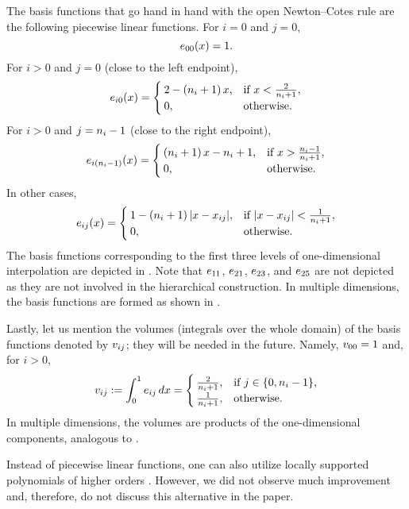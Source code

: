 
The basis functions that go hand in hand with the open Newton--Cotes rule are
the following piecewise linear functions. For $i = 0$ and $j = 0$,
\[
  e_{00}(x) = 1.
\]
For $i > 0$ and $j = 0$ (close to the left endpoint),
\[
  e_{i0}(x) = \begin{cases}
    2 - \left( n_i + 1 \right) x, & \text{if } x < \frac{2}{n_i + 1}, \\
    0, & \text{otherwise}.
  \end{cases}
\]
For $i > 0$ and $j = n_i - 1$ (close to the right endpoint),
\[
  e_{i(n_i - 1)}(x) = \begin{cases}
    \left( n_i + 1 \right) x - n_i + 1, & \text{if } x > \frac{n_i - 1}{n_i + 1}, \\
    0, & \text{otherwise}.
  \end{cases}
\]
In other cases,
\[
  e_{ij}(x) = \begin{cases}
    1 - \left( n_i + 1 \right)|x - x_{ij}|, & \text{if } |x - x_{ij}| < \frac{1}{n_i + 1}, \\
    0, & \text{otherwise}.
  \end{cases}
\]
The basis functions corresponding to the first three levels of one-dimensional
interpolation are depicted in . Note that $e_{11}$, $e_{21}$,
$e_{23}$, and $e_{25}$ are not depicted as they are not involved in the
hierarchical construction. In multiple dimensions, the basis functions are
formed as shown in .

Lastly, let us mention the volumes (integrals over the whole domain) of the
basis functions denoted by $v_{ij}$; they will be needed in the future. Namely,
$v_{00} = 1$ and, for $i > 0$,
\begin{equation} \elab{volume}
  \w_{ij} := \int_0^1 \e_{ij} \, \d x = \begin{cases}
    \frac{2}{\n_i + 1}, & \text{if } j \in \{ 0, \n_i - 1 \}, \\
    \frac{1}{\n_i + 1}, & \text{otherwise}.
  \end{cases}
\end{equation}
In multiple dimensions, the volumes are products of the one-dimensional
components, analogous to .

\begin{remark}
Instead of piecewise linear functions, one can also utilize locally supported
polynomials of higher orders \cite{jakeman2012}. However, we did not observe
much improvement and, therefore, do not discuss this alternative in the paper.
\end{remark}
